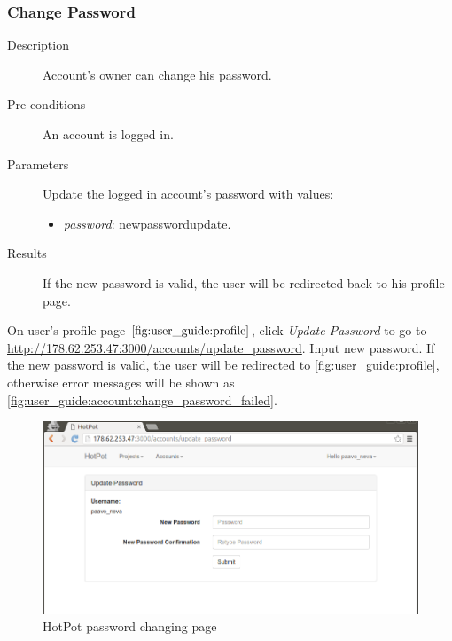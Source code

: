 \subsubsection{Change Password}
\label{ch:result:user_guide:account:change_password}

\begin{description}
\item[Description] Account's owner can change his password.
\item[Pre-conditions] An account is logged in.
\item[Parameters] Update the logged in account's password with values:
\begin{itemize}
\item \emph{password}: newpasswordupdate.
\end{itemize}
\item[Results] If the new password is valid, the user will be redirected back to his profile page.
\end{description}

On user's profile page \(\autoref{fig:user_guide:profile}\), click \emph{Update Password} to go to \href{http://178.62.253.47:3000/accounts/update\_password}{http://178.62.253.47:3000/accounts/update\_password}.
Input new password.
If the new password is valid, the user will be redirected to \autoref{fig:user_guide:profile}, otherwise error messages will be shown as \autoref{fig:user_guide:account:change_password_failed}.

\begin{figure}[bth]                                                                                                                                                  \myfloatalign
\includegraphics[width=1.0\linewidth]{gfx/chapter_5/account/change_password}
\caption[HotPot password changing page]{HotPot password changing page}
\label{fig:user_guide:account:change_password}
\end{figure}

